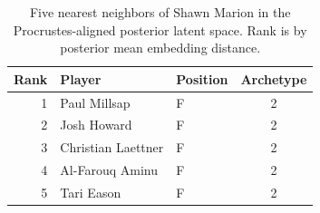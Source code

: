 \begin{table}[htbp]
  \centering\small
  \begin{tabular}{rllc}
    \toprule
    Rank & Player & Position & Archetype \\
    \midrule
    1 & Paul Millsap & F & 2 \\
    2 & Josh Howard & F & 2 \\
    3 & Christian Laettner & F & 2 \\
    4 & Al-Farouq Aminu & F & 2 \\
    5 & Tari Eason & F & 2 \\
    \bottomrule
  \end{tabular}
  \caption{Five nearest neighbors of Shawn Marion in the Procrustes-aligned posterior latent space. Rank is by posterior mean embedding distance.}
  \label{tab:Shawn_Marion_neighbors}
\end{table}

